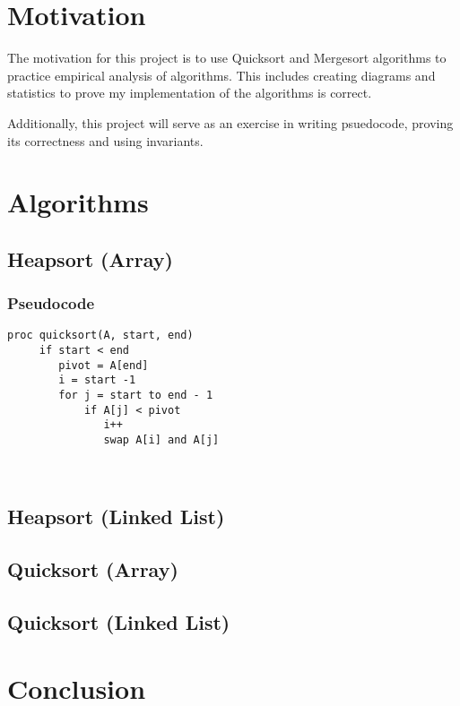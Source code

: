 \documentclass[a4paper,12pt]{article}
\begin{document}
\section{Motivation}

The motivation for this project is to use Quicksort and Mergesort algorithms to practice empirical analysis of algorithms.
This includes creating diagrams and statistics to prove my implementation of the algorithms is correct.

Additionally, this project will serve as an exercise in writing psuedocode, proving its correctness and using invariants.

\section{Algorithms}
\subsection{Heapsort (Array)}
\subsubsection{Pseudocode}
\begin{verbatim}
proc quicksort(A, start, end)
     if start < end
        pivot = A[end]
        i = start -1 
        for j = start to end - 1
            if A[j] < pivot
               i++
               swap A[i] and A[j]
             
        
\end{verbatim}
\subsection{Heapsort (Linked List)}
\subsection{Quicksort (Array)}
\subsection{Quicksort (Linked List)}
\section{Conclusion}
\end{document}
